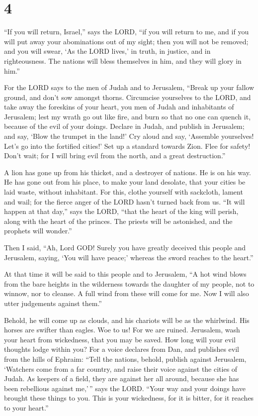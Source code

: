 \hypertarget{section-3}{%
\section{4}\label{section-3}}

 ``If you will return, Israel,'' says the LORD, ``if you
will return to me, and if you will put away your abominations out of my
sight; then you will not be removed;  and you will swear,
`As the LORD lives,' in truth, in justice, and in righteousness. The
nations will bless themselves in him, and they will glory in him.''

 For the LORD says to the men of Judah and to Jerusalem,
``Break up your fallow ground, and don't sow amongst thorns.
 Circumcise yourselves to the LORD, and take away the
foreskins of your heart, you men of Judah and inhabitants of Jerusalem;
lest my wrath go out like fire, and burn so that no one can quench it,
because of the evil of your doings.  Declare in Judah, and
publish in Jerusalem; and say, `Blow the trumpet in the land!' Cry aloud
and say, `Assemble yourselves! Let's go into the fortified cities!'
 Set up a standard towards Zion. Flee for safety! Don't
wait; for I will bring evil from the north, and a great destruction.''

 A lion has gone up from his thicket, and a destroyer of
nations. He is on his way. He has gone out from his place, to make your
land desolate, that your cities be laid waste, without inhabitant.
 For this, clothe yourself with sackcloth, lament and wail;
for the fierce anger of the LORD hasn't turned back from us.
 ``It will happen at that day,'' says the LORD, ``that the
heart of the king will perish, along with the heart of the princes. The
priests will be astonished, and the prophets will wonder.''

 Then I said, ``Ah, Lord GOD! Surely you have greatly
deceived this people and Jerusalem, saying, `You will have peace;'
whereas the sword reaches to the heart.''

 At that time it will be said to this people and to
Jerusalem, ``A hot wind blows from the bare heights in the wilderness
towards the daughter of my people, not to winnow, nor to cleanse.
 A full wind from these will come for me. Now I will also
utter judgements against them.''

 Behold, he will come up as clouds, and his chariots will
be as the whirlwind. His horses are swifter than eagles. Woe to us! For
we are ruined.  Jerusalem, wash your heart from wickedness,
that you may be saved. How long will your evil thoughts lodge within
you?  For a voice declares from Dan, and publishes evil
from the hills of Ephraim:  ``Tell the nations, behold,
publish against Jerusalem, `Watchers come from a far country, and raise
their voice against the cities of Judah.  As keepers of a
field, they are against her all around, because she has been rebellious
against me,'\,'' says the LORD.  ``Your way and your doings
have brought these things to you. This is your wickedness, for it is
bitter, for it reaches to your heart.''

